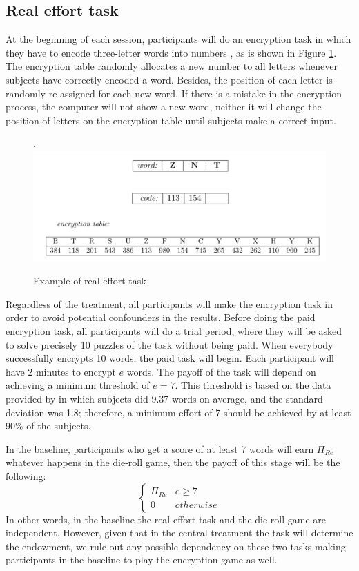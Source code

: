 \documentclass[12pt,final]{article}
\begin{document}
\subsection{Real effort task}
At the beginning of each session, participants will do an encryption task in which they have to encode three-letter words into numbers \citep{Benndorf2014}, as is shown in Figure \ref{task}.  The encryption table randomly allocates a new number to all letters whenever subjects have correctly encoded a word. Besides, the position of each letter is randomly re-assigned for each new word. If there is a mistake in the encryption process, the computer will not show a new word, neither it will change the position of letters on the encryption table until subjects make a correct input.

\begin{figure}[h!]
	\caption{Example of real effort task \citep{Benndorf2014}}.
	\includegraphics[scale=0.5]{Encryption_task}
	\label{task}
\end{figure}

Regardless of the treatment, all participants will make the encryption task in order to avoid potential confounders in the results. Before doing the paid encryption task, all participants will do a trial period, where they will be asked to solve precisely 10 puzzles of the task without being paid. When everybody successfully encrypts 10 words, the paid task will begin. Each participant will have 2 minutes to encrypt $e$ words. The payoff of the task will depend on achieving a minimum threshold of $e=7$. This threshold is based on the data provided by \citet{Benndorf2014} in which subjects did 9.37 words on average, and the standard deviation was 1.8; therefore, a minimum effort of 7 should be achieved by at least 90\% of the subjects.

In the baseline, participants who get a score of at least 7 words will earn $\Pi_{Re}$ whatever happens in the die-roll game, then the payoff of this stage  will be the following:
\[
\begin{cases} 
\Pi_{Re} & e \ge 7 \\
0 & otherwise
\end{cases}\]
In other words, in the baseline the real effort task and the die-roll game are independent. However, given that in the central treatment the task will determine the endowment, we rule out any possible dependency on these two tasks making participants in the baseline to play the encryption game as well.
\end{document}

